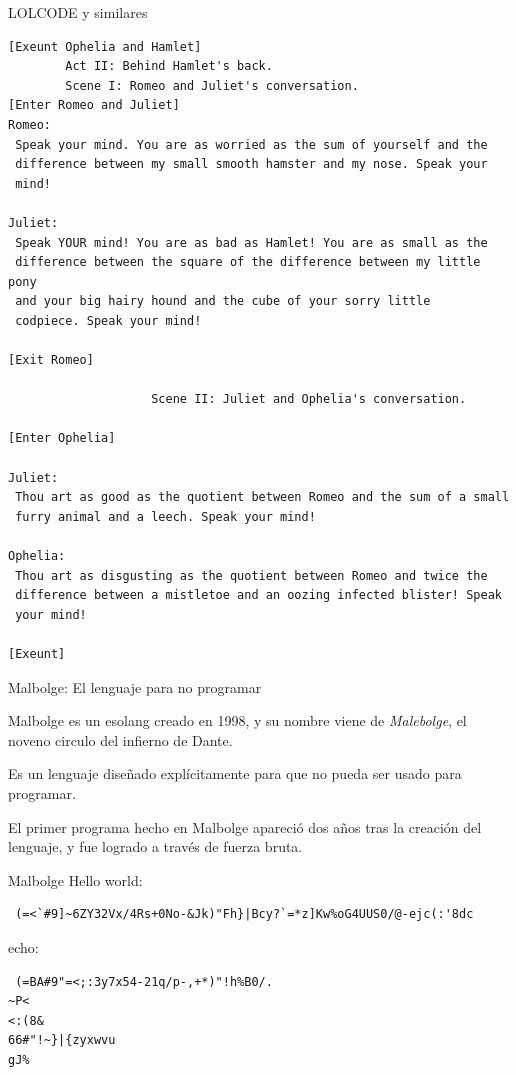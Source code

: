 \documentclass{beamer}
\begin{document}
\begin{frame}[fragile]{LOLCODE y similares}
\begin{lstlisting}
[Exeunt Ophelia and Hamlet]
        Act II: Behind Hamlet's back.
        Scene I: Romeo and Juliet's conversation.
[Enter Romeo and Juliet]
Romeo:
 Speak your mind. You are as worried as the sum of yourself and the
 difference between my small smooth hamster and my nose. Speak your
 mind!

Juliet:
 Speak YOUR mind! You are as bad as Hamlet! You are as small as the
 difference between the square of the difference between my little pony
 and your big hairy hound and the cube of your sorry little
 codpiece. Speak your mind!

[Exit Romeo]

                    Scene II: Juliet and Ophelia's conversation.

[Enter Ophelia]

Juliet:
 Thou art as good as the quotient between Romeo and the sum of a small
 furry animal and a leech. Speak your mind!

Ophelia:
 Thou art as disgusting as the quotient between Romeo and twice the
 difference between a mistletoe and an oozing infected blister! Speak
 your mind!

[Exeunt]
    \end{lstlisting}
\end{frame}

\begin{frame}{Malbolge: El lenguaje para no programar}

Malbolge es un esolang creado en 1998, y su nombre viene de \textit{Malebolge}, el noveno circulo del infierno de Dante.

Es un lenguaje diseñado explícitamente para que no pueda ser usado para programar.

El primer programa hecho en Malbolge apareció dos años tras la creación del lenguaje, y fue logrado a través de fuerza bruta.
    
\end{frame}

\begin{frame}[fragile]{Malbolge}
Hello world:
\begin{lstlisting}
 (=<`#9]~6ZY32Vx/4Rs+0No-&Jk)"Fh}|Bcy?`=*z]Kw%oG4UUS0/@-ejc(:'8dc
\end{lstlisting}

echo:
\begin{lstlisting}
 (=BA#9"=<;:3y7x54-21q/p-,+*)"!h%B0/.
~P<
<:(8&
66#"!~}|{zyxwvu
gJ%
\end{lstlisting}
\end{frame}
\end{document}
